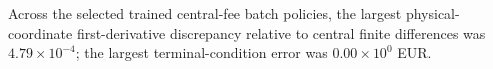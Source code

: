 Across the selected trained central-fee batch policies, the largest physical-coordinate first-derivative discrepancy relative to central finite differences was $4.79\times10^{-4}$; the largest terminal-condition error was $0.00\times10^{0}$ EUR.